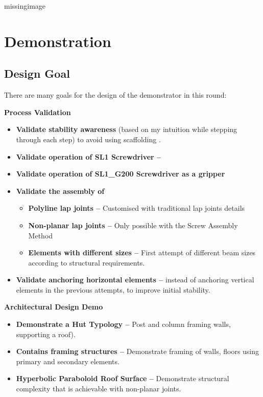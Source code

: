 missingimage

\section{Demonstration}
\label{section:exploration_4_demonstration}

\subsection{Design Goal}
\label{subsection:exploration_4_design_goal}

There are many goals for the design of the demonstrator in this round:

\textbf{Process Validation}
\begin{itemize}
    \item \textbf{Validate stability awareness} (based on my intuition while stepping through each step) to avoid using scaffolding .
    \item \textbf{Validate operation of SL1 Screwdriver --} 
    \item \textbf{Validate operation of SL1\_G200 Screwdriver as a gripper}
    \item \textbf{Validate the assembly of}
    \begin{itemize}
        \item \textbf{Polyline lap joints --} Customised with traditional lap joints details 
        \item \textbf{Non-planar lap joints --} Only possible with the Screw Assembly Method 
        \item \textbf{Elements with different sizes --} First attempt of different beam sizes according to structural requirements.
    \end{itemize}
    \item \textbf{Validate anchoring horizontal elements --} instead of anchoring vertical elements in the previous attempts, to improve initial stability.
\end{itemize}
\textbf{Architectural Design Demo}
\begin{itemize}
    \item \textbf{Demonstrate a Hut Typology --} Post and column framing walls, supporting a roof).
    \item \textbf{Contains framing structures --} Demonstrate framing of walls, floors using primary and secondary elements.
    \item \textbf{Hyperbolic Paraboloid Roof Surface --} Demonstrate structural complexity that is achievable with non-planar joints.
\end{itemize}

